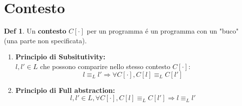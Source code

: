 \documentclass[a4paper]{report}
\theoremstyle{definition} \newtheorem*{defi}{Def}
\theoremstyle{plain} \newtheorem{lemma}{Lemma}
\theoremstyle{plain} \newtheorem{teo}{Teorema}
\theoremstyle{remark} \newtheorem*{es}{Esempio}
\begin{document}
\section{Contesto}
\begin{defi}
	Un {\bf contesto} $C[\cdot]$ per un programma \'e un programma con un "buco" (una parte non specificata).
	\end{defi}
	\begin{enumerate}
	\item {\bf Principio di Subsitutivity:}
	\\
	$l, l' \in L$ che possono comparire nello stesso contesto $C[\cdot]$:
	$$
		l \equiv_L l' \Rightarrow \forall C[\cdot] , C[l] \equiv_L C[l']
	$$
	\item {\bf Principio di Full abstraction:}
	$$
		l,l' \in L, \forall C[\cdot], C[l] \equiv_L C[l'] \Longrightarrow l \equiv_L l'
	$$
\end{enumerate}
\end{document}
